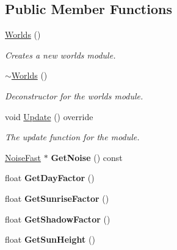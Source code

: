 \subsection*{Public Member Functions}
\begin{DoxyCompactItemize}
\item 
\hyperlink{class_flounder_1_1_worlds_a3cd4af77cc7845c4cc33090a247a5a11}{Worlds} ()
\begin{DoxyCompactList}\small\item\em Creates a new worlds module. \end{DoxyCompactList}\item 
\hyperlink{class_flounder_1_1_worlds_a9d4dc057202a37e2d49e2a839687dcfd}{$\sim$\+Worlds} ()
\begin{DoxyCompactList}\small\item\em Deconstructor for the worlds module. \end{DoxyCompactList}\item 
void \hyperlink{class_flounder_1_1_worlds_a94f6f6c9d363ba368e835307f6b3938c}{Update} () override
\begin{DoxyCompactList}\small\item\em The update function for the module. \end{DoxyCompactList}\item 
\mbox{\label{class_flounder_1_1_worlds_afd3a710d578441c84885bfd76ac3c421}} 
\hyperlink{class_flounder_1_1_noise_fast}{Noise\+Fast} $\ast$ {\bfseries Get\+Noise} () const
\item 
\mbox{\label{class_flounder_1_1_worlds_a18294f9be4dffc232df21a6cd952b0b1}} 
float {\bfseries Get\+Day\+Factor} ()
\item 
\mbox{\label{class_flounder_1_1_worlds_a144afecfa1f638118d480a8d40fae79b}} 
float {\bfseries Get\+Sunrise\+Factor} ()
\item 
\mbox{\label{class_flounder_1_1_worlds_ac4d66506dd5042467e29c559ad1e306b}} 
float {\bfseries Get\+Shadow\+Factor} ()
\item 
\mbox{\label{class_flounder_1_1_worlds_ac5b5adec21a443945e94eb3b318aa275}} 
float {\bfseries Get\+Sun\+Height} ()
\item 
\mbox{\label{class_flounder_1_1_worlds_aee3810486865a836a846bb0b650d6ff0}} 

\end{DoxyCompactItemize}
